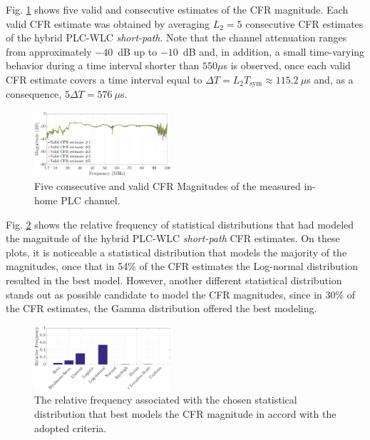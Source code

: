 \documentclass[journal]{IEEEtran}
\begin{document}
 Fig. \ref{respfreqsW} shows five valid and consecutive estimates of the \ac{CFR} magnitude. Each valid \ac{CFR} estimate was obtained by averaging  $L_2=5$ consecutive \ac{CFR} estimates of the hybrid \ac{PLC}-\ac{WLC} \textit{short-path}. Note that the channel attenuation ranges from approximately $-40$~dB up to $-10$~dB and, in addition, a small time-varying behavior during a time interval shorter than $550\mu$s is observed, once each valid \ac{CFR} estimate covers a time interval equal to $\Delta T = L_2 T_{\textrm{sym}} \approx 115.2~\mu$s and, as a consequence, $5\Delta T = 576~\mu$s. 

\begin{figure}[h]
	\centering
	\includegraphics[width=0.45\textwidth]{images/respfreqsW.eps}
	\caption{Five consecutive and valid CFR Magnitudes of the measured in-home PLC channel.}
	\label{respfreqsW}
\end{figure}

Fig. \ref{MAG_percentsW} shows the relative frequency of statistical distributions that had modeled the magnitude of the hybrid \ac{PLC}-\ac{WLC} \textit{short-path} \ac{CFR} estimates. On these plots, it is noticeable a statistical distribution that models the majority of the magnitudes, once that in 54\% of the \ac{CFR} estimates the Log-normal distribution resulted in the best model. However, another different statistical distribution stands out as possible candidate to model the \ac{CFR} magnitudes, since in 30\% of the \ac{CFR} estimates, the Gamma distribution offered the best modeling. 

\begin{figure}[h!]
	\centering
	\includegraphics[width=0.45\textwidth]{images/MAG_percentsW.eps}
	\caption{The relative frequency associated with the chosen statistical distribution that best models the CFR magnitude in accord with the adopted criteria.}
	\label{MAG_percentsW}
\end{figure}
\end{document}
